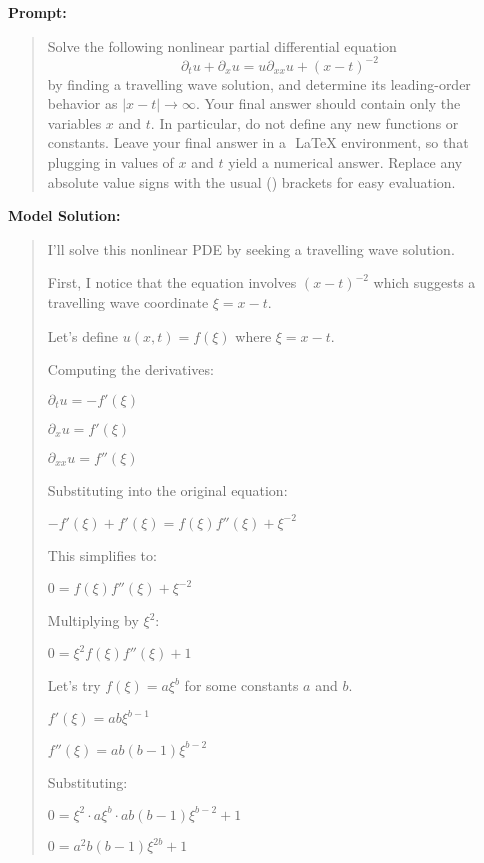 \documentclass{article}
\begin{document}
\textbf{Prompt:}
\begin{quote}
Solve the following nonlinear partial differential equation $$\partial_t u + \partial_x u = u \partial_{xx}u + (x-t)^{-2}$$by finding a travelling wave solution, and determine its leading-order behavior as $|x-t| \to \infty$. Your final answer should contain only the variables $x$ and $t$. In particular, do not define any new functions or constants. Leave your final answer in a $\boxed{}$ LaTeX environment, so that plugging in values of $x$ and $t$ yield a numerical answer. Replace any absolute value signs with the usual () brackets for easy evaluation.
\end{quote}
\textbf{Model Solution:}
\begin{quote}
I'll solve this nonlinear PDE by seeking a travelling wave solution.



First, I notice that the equation involves $(x-t)^{-2}$ which suggests a travelling wave coordinate $\xi = x-t$.



Let's define $u(x,t) = f(\xi)$ where $\xi = x-t$.



Computing the derivatives:

$\partial_t u = -f'(\xi)$

$\partial_x u = f'(\xi)$

$\partial_{xx} u = f''(\xi)$



Substituting into the original equation:

$-f'(\xi) + f'(\xi) = f(\xi)f''(\xi) + \xi^{-2}$



This simplifies to:

$0 = f(\xi)f''(\xi) + \xi^{-2}$



Multiplying by $\xi^2$:

$0 = \xi^2 f(\xi)f''(\xi) + 1$



Let's try $f(\xi) = a\xi^b$ for some constants $a$ and $b$.

$f'(\xi) = ab\xi^{b-1}$

$f''(\xi) = ab(b-1)\xi^{b-2}$



Substituting:

$0 = \xi^2 \cdot a\xi^b \cdot ab(b-1)\xi^{b-2} + 1$

$0 = a^2b(b-1)\xi^{2b} + 1$




\end{quote}
\end{document}
